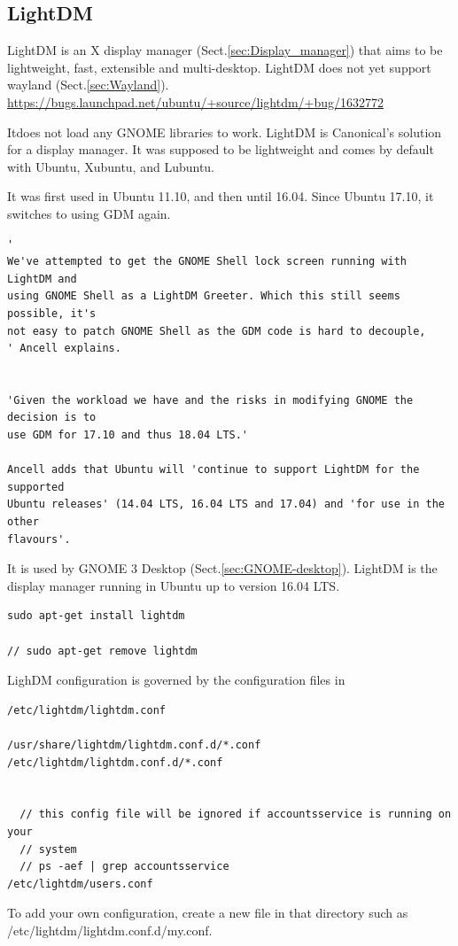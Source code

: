 \subsection{LightDM}
\label{sec:LightDM}

LightDM is an X display manager (Sect.\ref{sec:Display_manager}) that aims to be
lightweight, fast, extensible and multi-desktop. 
LightDM does not yet support wayland (Sect.\ref{sec:Wayland}).
\url{https://bugs.launchpad.net/ubuntu/+source/lightdm/+bug/1632772}

Itdoes not load any GNOME
libraries to work. LightDM is Canonical's solution for a display manager. It was
supposed to be lightweight and comes by default with Ubuntu, Xubuntu, and Lubuntu.

It was first used in Ubuntu 11.10, and then until 16.04. Since Ubuntu 17.10, it
switches to using GDM again.

\begin{verbatim}
'
We've attempted to get the GNOME Shell lock screen running with LightDM and
using GNOME Shell as a LightDM Greeter. Which this still seems possible, it's
not easy to patch GNOME Shell as the GDM code is hard to decouple,
' Ancell explains.


'Given the workload we have and the risks in modifying GNOME the decision is to
use GDM for 17.10 and thus 18.04 LTS.'

Ancell adds that Ubuntu will 'continue to support LightDM for the supported
Ubuntu releases' (14.04 LTS, 16.04 LTS and 17.04) and 'for use in the other
flavours'.  
\end{verbatim}


It is used by GNOME 3 Desktop
(Sect.\ref{sec:GNOME-desktop}). LightDM is the display manager running in Ubuntu
up to version 16.04 LTS.


\begin{verbatim}
sudo apt-get install lightdm

// sudo apt-get remove lightdm
\end{verbatim}



LighDM configuration is governed by the configuration files in
\begin{verbatim}
/etc/lightdm/lightdm.conf

/usr/share/lightdm/lightdm.conf.d/*.conf
/etc/lightdm/lightdm.conf.d/*.conf


  // this config file will be ignored if accountsservice is running on your
  // system
  // ps -aef | grep accountsservice
/etc/lightdm/users.conf
\end{verbatim}
To add your own configuration, create a new file in that directory such as
/etc/lightdm/lightdm.conf.d/my.conf.

